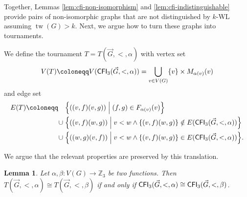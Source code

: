 \PassOptionsToPackage{dvipsnames,svgnames}{xcolor}\documentclass[10pt,a4paper]{article}
\newtheorem{lemma}{Lemma}[section]
\newcommand{\ZZ}{{\mathbb Z}}
\newcommand{\Bigmid}{\;\Big|\;}
\DeclareMathOperator{\tw}{tw}
\newcommand{\CFI}{{\sf CFI}}
\begin{document}
Together, Lemmas \ref{lem:cfi-non-isomorphism} and \ref{lem:cfi-indistinguishable} provide pairs of non-isomorphic graphs that are not distinguished by $k$-WL assuming $\tw(G) > k$.
Next, we argue how to turn these graphs into tournaments.

We define the tournament $T = T(\vec{G},<,\alpha)$ with vertex set
\[V(T) \coloneqq V(\CFI_3(\vec{G},<,\alpha)) = \bigcup_{v \in V(G)} \{v\} \times M_{\alpha(v)}(v)\]
and edge set
\begin{align*}
 E(T) \coloneqq \quad  &\Big\{((v,f)(v,g)) \Bigmid (f,g) \in F_{\alpha(v)}(v)\Big\}\\
                \cup\; &\Big\{((v,f)(w,g)) \Bigmid v < w \wedge \{(v,f)(w,g)\} \notin E(\CFI_3(\vec{G},<,\alpha))\Big\}\\
                \cup\; &\Big\{((w,g)(v,f)) \Bigmid v < w \wedge \{(v,f)(w,g)\} \in E(\CFI_3(\vec{G},<,\alpha))\Big\}.
\end{align*}

We argue that the relevant properties are preserved by this translation.

\begin{lemma}
 \label{lem:cfi-tournament-isomorphism}
 Let $\alpha,\beta\colon V(G) \to \ZZ_3$ be two functions.
 Then $T(\vec{G},<,\alpha) \cong T(\vec{G},<,\beta)$ if and only if $\CFI_3(\vec{G},<,\alpha) \cong \CFI_3(\vec{G},<,\beta)$.
\end{lemma}
\end{document}
